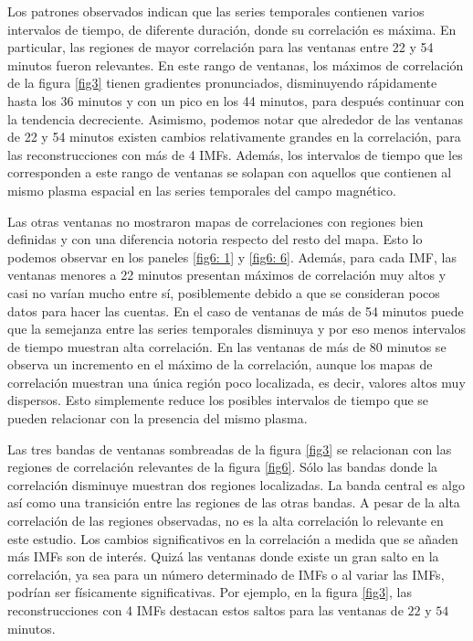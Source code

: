 Los patrones observados indican que las series temporales contienen varios intervalos de tiempo, de diferente duración, donde su correlación es máxima. En particular, las regiones de mayor correlación para las ventanas entre 22 y 54 minutos fueron relevantes. En este rango de ventanas, los máximos de correlación de la figura \ref{fig3} tienen gradientes pronunciados, disminuyendo rápidamente hasta los 36 minutos y con un pico en los 44 minutos, para después continuar con la tendencia decreciente. Asimismo, podemos notar que alrededor de las ventanas de 22 y 54 minutos existen cambios relativamente grandes en la correlación, para las reconstrucciones con más de 4 IMFs. Además, los intervalos de tiempo que les corresponden a este rango de ventanas se solapan con aquellos que contienen al mismo plasma espacial en las series temporales del campo magnético.   

Las otras ventanas no mostraron mapas de correlaciones con regiones bien definidas y con una diferencia notoria respecto del resto del mapa. Esto lo podemos observar en los paneles \ref{fig6: 1} y \ref{fig6: 6}. Además, para cada IMF, las ventanas menores a 22 minutos presentan máximos de correlación muy altos y casi no varían mucho entre sí, posiblemente debido a que se consideran pocos datos para hacer las cuentas. En el caso de ventanas de más de 54 minutos puede que la semejanza entre las series temporales disminuya y por eso menos intervalos de tiempo muestran alta correlación. En las ventanas de más de 80 minutos se observa un incremento en el máximo de la correlación, aunque los mapas de correlación muestran una única región poco localizada, es decir, valores altos muy dispersos. Esto simplemente reduce los posibles intervalos de tiempo que se pueden relacionar con la presencia del mismo plasma.    

Las tres bandas de ventanas sombreadas de la figura \ref{fig3} se relacionan con las regiones de correlación relevantes de la figura \ref{fig6}. Sólo las bandas donde la correlación disminuye muestran dos regiones localizadas. La banda central es algo así como una transición entre las regiones de las otras bandas. A pesar de la alta correlación de las regiones observadas, no es la alta correlación lo relevante en este estudio. Los cambios significativos en la correlación a medida que se añaden más IMFs son de interés. Quizá las ventanas donde existe un gran salto en la correlación, ya sea para un número determinado de IMFs o al variar las IMFs, podrían ser físicamente significativas. Por ejemplo, en la figura \ref{fig3}, las reconstrucciones con 4 IMFs destacan estos saltos para las ventanas de $22$ y $54$ minutos.

